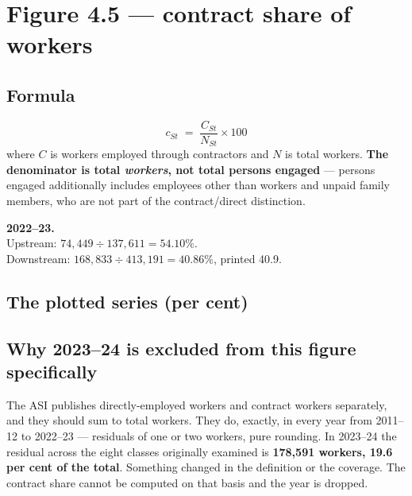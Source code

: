 \documentclass[11pt, a4paper]{article}
\begin{document}
\section{Figure 4.5 --- contract share of workers}

\subsection{Formula}
\[
c_{St} \;=\; \frac{C_{St}}{N_{St}} \times 100
\]
where $C$ is workers employed through contractors and $N$ is total workers.
\textbf{The denominator is total \emph{workers}, not total persons engaged} ---
persons engaged additionally includes employees other than workers and unpaid family
members, who are not part of the contract/direct distinction.

\begin{work}
\textbf{2022--23.} \\
Upstream: $74{,}449 \div 137{,}611 = 54.10\%$. \\
Downstream: $168{,}833 \div 413{,}191 = 40.86\%$, printed 40.9.
\end{work}

\subsection{The plotted series (per cent)}

\begin{table}[H]
\centering\footnotesize
{}
\end{table}

\subsection{Why 2023--24 is excluded from this figure specifically}

The ASI publishes directly-employed workers and contract workers separately, and they
should sum to total workers. They do, exactly, in every year from 2011--12 to
2022--23 --- residuals of one or two workers, pure rounding. In 2023--24 the residual
across the eight classes originally examined is \textbf{178{,}591 workers, 19.6 per
cent of the total}. Something changed in the definition or the coverage. The contract
share cannot be computed on that basis and the year is dropped.
\end{document}
